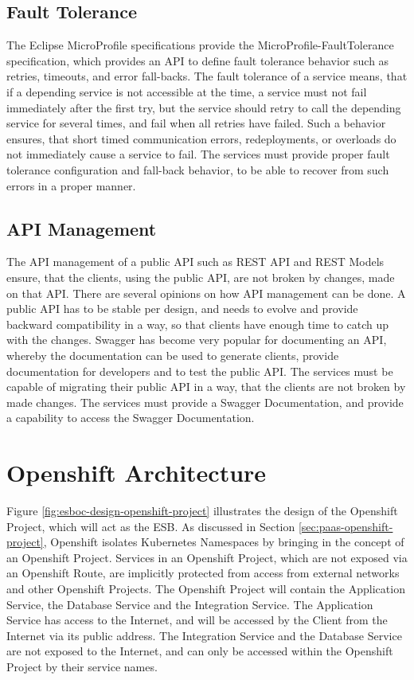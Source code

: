 \subsection{Fault Tolerance}
\label{sec:esboc-requirements-service-fault}
The Eclipse MicroProfile specifications provide the MicroProfile-FaultTolerance specification, which provides an API to define fault tolerance behavior such as retries, timeouts, and error fall-backs. The fault tolerance of a service means, that if a depending service is not accessible at the time, a service must not fail immediately after the first try, but the service should retry to call the depending service for several times, and fail when all retries have failed. Such a behavior ensures, that short timed communication errors, redeployments, or overloads do not immediately cause a service to fail. The services must provide proper fault tolerance configuration and fall-back behavior, to be able to recover from such errors in a proper manner\cite{EclipseMicroprofileFault2018}.   

\subsection{API Management}
\label{sec:esboc-requirements-service-api}
The API management of a public API such as REST API and REST Models ensure, that the clients, using the public API, are not broken by changes, made on that API. There are several opinions on how API management can be done. A public API has to be stable per design, and needs to evolve and provide backward compatibility in a way, so that clients have enough time to catch up with the changes. Swagger has become very popular for documenting an API, whereby the documentation can be used to generate clients, provide documentation for developers and to test the public API. The services must be capable of migrating their public API in a way, that the clients are not broken by made changes. The services must provide a Swagger Documentation, and provide a capability to access the Swagger Documentation\cite{SmartBearSwagger2018, RestVersion2018}.

\section{Openshift Architecture}
\label{sec:esboc-design-oc}
Figure \vref{fig:esboc-design-openshift-project} illustrates the design of the Openshift Project, which will act as the ESB. As discussed in Section \vref{sec:paas-openshift-project}, Openshift isolates Kubernetes Namespaces  by bringing in the concept of an Openshift Project. Services in an Openshift Project, which are not exposed via an Openshift Route, are implicitly protected from access from external networks and other Openshift Projects. The Openshift Project will contain the Application Service, the Database Service and the Integration Service. The Application Service has access to the Internet, and will be accessed by the Client from the Internet via its public address. The Integration Service and the Database Service are not exposed to the Internet, and can only be accessed within the Openshift Project by their service names.

